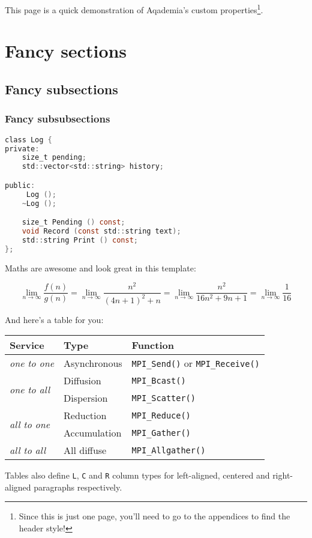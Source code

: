 This page is a quick demonstration of Aqademia's custom properties\footnote{%
	Since this is just one page, you'll need to go to the appendices to find the header style!
}.

\section{Fancy sections}

\subsection{Fancy subsections}

\subsubsection{Fancy subsubsections}

\begin{lstlisting}[language=C]
class Log {
private:
	size_t pending;
	std::vector<std::string> history;

public:
	 Log ();
	~Log ();

	size_t Pending () const;
	void Record (const std::string text);
	std::string Print () const;
};
\end{lstlisting}

Maths are awesome and look great in this template:

\[\lim_{n\to\infty} \frac{f(n)}{g(n)} = \lim_{n\to\infty} \frac{n^2}{{(4n+1)}^2+n} = \lim_{n\to\infty} \frac{n^2}{16n^2+9n+1} = \lim_{n\to\infty} \frac{1}{16}\]

And here's a table for you:

\begin{center}
\begin{tabular}{l l l}
	\textbf{Service}                     & \textbf{Type} & \textbf{Function}                               \\
	\toprule
	\textit{one to one}                  & Asynchronous  & \texttt{MPI\_Send()} or \texttt{MPI\_Receive()} \\
	\midrule
	\multirow{2}{*}{\textit{one to all}} & Diffusion     & \texttt{MPI\_Bcast()}                           \\
                                        & Dispersion    & \texttt{MPI\_Scatter()}                         \\
	\midrule
	\multirow{2}{*}{\textit{all to one}} & Reduction     & \texttt{MPI\_Reduce()}                          \\
                                        & Accumulation  & \texttt{MPI\_Gather()}                          \\
	\midrule
	\textit{all to all}                  & All diffuse   & \texttt{MPI\_Allgather()}                       \\
\end{tabular}
\end{center}

Tables also define \texttt{L}, \texttt{C} and \texttt{R} column types for left-aligned, centered and right-aligned paragraphs respectively.

